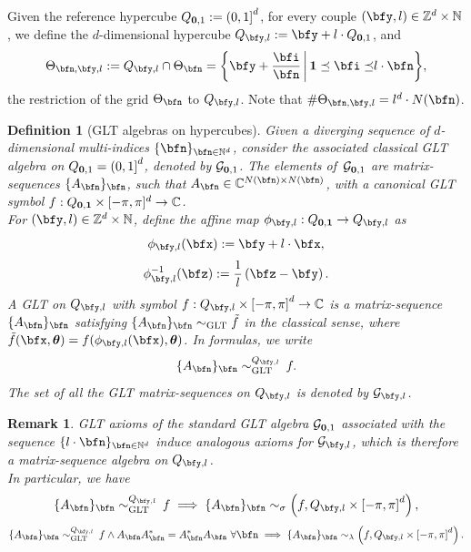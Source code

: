 \documentclass{amsart}
\newtheorem{defn}[thm]{Definition}
\newtheorem{rem}[thm]{Remark}
\newcommand{\bftheta}{{\boldsymbol\theta}}
\begin{document}
    Given the reference hypercube $Q_{{\bf0},1}:=\left(0,1\right]^d$, for every couple $(\bfy,l)\in\mathbb{Z}^{d}\times\mathbb{N}$, we define the $d$-dimensional hypercube $Q_{{\bfy},l}:=\bfy+l\cdot Q_{{\bf0},1}$, and
\begin{equation*}
	\Theta_{\bfn,\bfy,l}:=Q_{{\bfy},l}\cap\Theta_{\bfn}=\biggl\{\bfy+\frac{\bfi}{\bfn}\,\bigg|\,{\bf1\preceq\bfi\preceq}l\cdot\bfn\biggr\},
\end{equation*}
the restriction of the grid $\Theta_{\bfn}$ to $Q_{{\bfy},l}$.
Note that $\#\Theta_{\bfn,\bfy,l}=l^d\cdot N(\bfn)$.
    \begin{defn}[GLT algebras on hypercubes]\label{hypercube}
    Given a diverging sequence of $d$-dimensional multi-indices $\{\bfn\}_{\bfn\in\mathbb{N}^d}$, consider the associated classical GLT algebra on $Q_{{\bf0},1}=\left(0,1\right]^d$, denoted by $\mathcal{G}_{{\bf0},1}$. The elements of \,$\mathcal{G}_{{\bf0},1}$ are matrix-sequences $\{A_{\bfn}\}_{\bfn}$, such that $A_{\bfn}\in\mathbb{C}^{N(\bfn)\times N(\bfn)}$, with a canonical GLT symbol $f:Q_{\bf0,1}\times[-\pi,\pi]^d\to\mathbb{C}$.\\
    For $(\bfy,l)\in\mathbb{Z}^{d}\times\mathbb{N}$, define the affine map $\phi_{{\bfy},l}:Q_{\bf0,1}\to Q_{\bfy,l}$ as
	\begin{equation*}
		\phi_{{\bfy},l}(\bfx):=\bfy+l\cdot \bfx,
	\end{equation*}
	\begin{equation*}
		\phi_{{\bfy},l}^{-1}(\bfz):=\frac{1}{l}\left(\bfz-\bfy\right).
	\end{equation*}
	A GLT on $Q_{{\bfy},l}$ with symbol $f:Q_{{\bfy},l}\times\left[-\pi,\pi\right]^d\to\mathbb{C}$ is a matrix-sequence $\{A_{\bfn}\}_{\bfn}$ satisfying $\{A_{\bfn}\}_{\bfn}\sim_{\mathrm{GLT}}\tilde{f}$ in the classical sense, where $\tilde{f}(\bfx,\bftheta)=f(\phi_{{\bfy},l}(\bfx),\bftheta)$. In formulas, we write 
	\begin{equation*}
		\{A_{\bfn}\}_{\bfn}\sim_{\mathrm{GLT}}^{Q_{\bfy,l}}\,f.
	\end{equation*} 
	The set of all the GLT matrix-sequences on $Q_{{\bfy},l}$ is denoted by $\mathcal{G}_{{\bfy},l}$.
\end{defn}
\begin{rem}
	GLT axioms of the standard GLT algebra $\mathcal{G}_{{\bf0},1}$ associated with the sequence $\{l\cdot\bfn\}_{\bfn\in\mathbb{N}^d}$ induce analogous axioms for $\mathcal{G}_{{\bfy},l}$, which is therefore a matrix-sequence algebra on $Q_{{\bfy},l}$.\\  In particular, we have
	\begin{equation*}
		\{A_{\bfn}\}_{\bfn}\sim_{\mathrm{GLT}}^{Q_{{\bfy},l}}\, f \implies \{A_{\bfn}\}_{\bfn}\sim_{\sigma}\left(f,Q_{{\bfy},l}\times\left[-\pi,\pi\right]^d\right),
	\end{equation*} 
	\begin{equation*}
		\{A_{\bfn}\}_{\bfn}\sim_{\mathrm{GLT}}^{Q_{\bfy,l}}\,f\wedge A_{\bfn}A_{\bfn}^*=A_{\bfn}^*A_{\bfn} \text{ } \forall\bfn \implies
		 \{A_{\bfn}\}_{\bfn}\sim_{\lambda}\left(f,Q_{{\bfy},l}\times\left[-\pi,\pi\right]^d\right).
	\end{equation*}
\end{rem}
\end{document}
